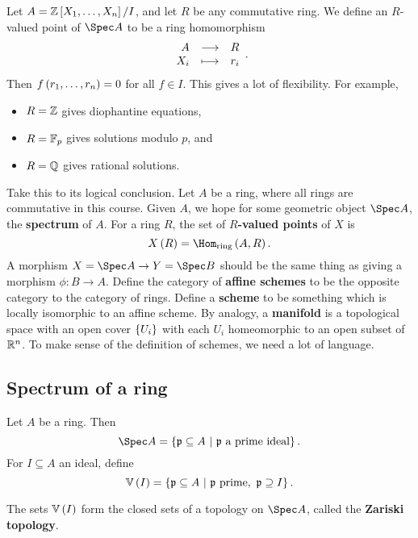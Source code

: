 \pagebreak

\begin{example*}
Let $ A = \ZZ\sbr{X_1, \dots, X_n} / I $, and let $ R $ be any commutative ring. We define an $ R $-valued point of $ \Spec A $ to be a ring homomorphism
$$ \function{A}{R}{X_i}{r_i}. $$
Then $ f\br{r_1, \dots, r_n} = 0 $ for all $ f \in I $. This gives a lot of flexibility. For example,
\begin{itemize}
\item $ R = \mathbb{Z} $ gives diophantine equations,
\item $ R = \mathbb{F}_p $ gives solutions modulo $ p $, and
\item $ R = \mathbb{Q} $ gives rational solutions.
\end{itemize}
\end{example*}

Take this to its logical conclusion. Let $ A $ be a ring, where all rings are commutative in this course. Given $ A $, we hope for some geometric object $ \Spec A $, the \textbf{spectrum} of $ A $. For a ring $ R $, the set of \textbf{$ R $-valued points} of $ X $ is
$$ X\br{R} = \Hom_{\text{ring}}\br{A, R}. $$
A morphism $ X = \Spec A \to Y = \Spec B $ should be the same thing as giving a morphism $ \phi : B \to A $. Define the category of \textbf{affine schemes} to be the opposite category to the category of rings. Define a \textbf{scheme} to be something which is locally isomorphic to an affine scheme. By analogy, a \textbf{manifold} is a topological space with an open cover $ \cbr{U_i} $ with each $ U_i $ homeomorphic to an open subset of $ \mathbb{R}^n $. To make sense of the definition of schemes, we need a lot of language.

\subsection{Spectrum of a ring}

\begin{definition*}
Let $ A $ be a ring. Then
$$ \Spec A = \cbr{\ppp \subseteq A \st \ppp \ \text{a prime ideal}}. $$
For $ I \subseteq A $ an ideal, define
$$ \VV\br{I} = \cbr{\ppp \subseteq A \st \ppp \ \text{prime}, \ \ppp \supseteq I}. $$
\end{definition*}

\begin{proposition}
The sets $ \VV\br{I} $ form the closed sets of a topology on $ \Spec A $, called the \textbf{Zariski topology}.
\end{proposition}

